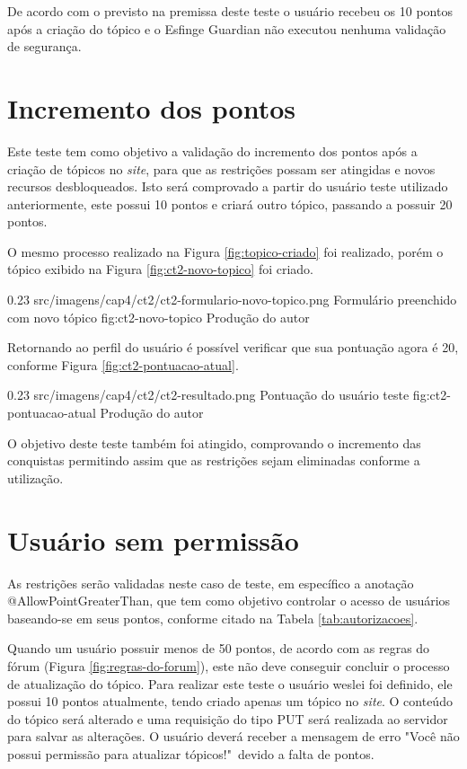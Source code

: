 \par De acordo com o previsto na premissa deste teste o usuário recebeu os 10 pontos após a criação do tópico e o Esfinge Guardian não executou nenhuma validação de segurança.

\section{Incremento dos pontos}

\par Este teste tem como objetivo a validação do incremento dos pontos após a criação de tópicos no \textit{site}, para que as restrições possam ser atingidas e novos recursos desbloqueados. Isto será comprovado a partir do usuário teste utilizado anteriormente, este possui 10 pontos e criará outro tópico, passando a possuir 20 pontos.

\par O mesmo processo realizado na Figura \ref{fig:topico-criado} foi realizado, porém o tópico exibido na Figura \ref{fig:ct2-novo-topico} foi criado.

\begin{image}
{0.23}
{src/imagens/cap4/ct2/ct2-formulario-novo-topico.png}
{Formulário preenchido com novo tópico}
{fig:ct2-novo-topico}
{Produção do autor}
\end{image}

\par Retornando ao perfil do usuário é possível verificar que sua pontuação agora é 20, conforme Figura \ref{fig:ct2-pontuacao-atual}.

\begin{image}
{0.23}
{src/imagens/cap4/ct2/ct2-resultado.png}
{Pontuação do usuário teste}
{fig:ct2-pontuacao-atual}
{Produção do autor}
\end{image}

\par O objetivo deste teste também foi atingido, comprovando o incremento das conquistas permitindo assim que as restrições sejam eliminadas conforme a utilização.

\section{Usuário sem permissão}

\par As restrições serão validadas neste caso de teste, em específico a anotação @AllowPointGreaterThan, que tem como objetivo controlar o acesso de usuários baseando-se em seus pontos, conforme citado na Tabela \ref{tab:autorizacoes}.
\par Quando um usuário possuir menos de 50 pontos, de acordo com as regras do fórum (Figura \ref{fig:regras-do-forum}), este não deve conseguir concluir o processo de atualização do tópico. Para realizar este teste o usuário weslei foi definido, ele possui 10 pontos atualmente, tendo criado apenas um tópico no \textit{site}. O conteúdo do tópico será alterado e uma requisição do tipo PUT será realizada ao servidor para salvar as alterações. O usuário deverá receber a mensagem de erro "Você não possui permissão para atualizar tópicos!"\ devido a falta de pontos.

